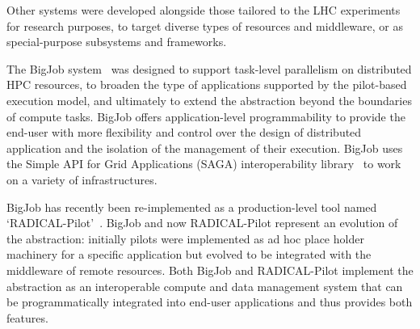 \documentclass{sig-alternate}
\begin{document}
Other \pilotjob systems were developed alongside those tailored to the LHC
experiments for research purposes, to target diverse types of resources and
middleware, or as special-purpose subsystems and frameworks.

The BigJob \pilotjob system~\cite{luckow2010} was designed to support task-level
parallelism on distributed HPC resources, to broaden the type of applications
supported by the pilot-based execution model, and ultimately to extend the
\pilot abstraction beyond the boundaries of compute tasks. BigJob offers
application-level programmability to provide the end-user with more flexibility
and control over the design of distributed application and the isolation of the
management of their execution. BigJob uses the Simple API for Grid Applications
(SAGA) interoperability library~\cite{merzky2015saga,goodale2006,luckow2010} to
work on a variety of infrastructures.




BigJob has recently been re-implemented as a production-level tool named
`RADICAL-Pilot'~\cite{merzky2015radical}. BigJob and now RADICAL-Pilot represent
an evolution of the \pilot abstraction: initially pilots were implemented as ad
hoc place holder machinery for a specific application but evolved to be
integrated with the middleware of remote resources. Both BigJob and
RADICAL-Pilot implement the \pilot abstraction as an interoperable compute and
data management system that can be programmatically integrated into end-user
applications and thus provides both features.

\end{document}
